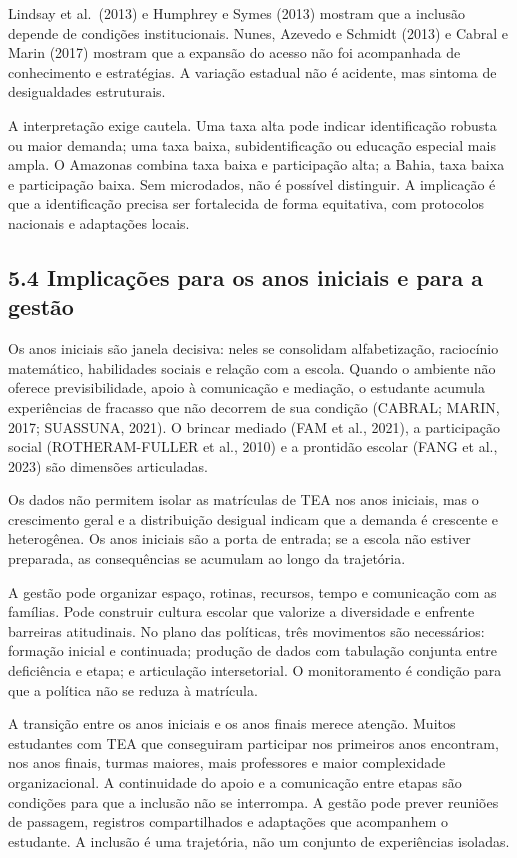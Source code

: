 Lindsay et al.~(2013) e Humphrey e Symes (2013) mostram que a inclusão
depende de condições institucionais. Nunes, Azevedo e Schmidt (2013) e
Cabral e Marin (2017) mostram que a expansão do acesso não foi
acompanhada de conhecimento e estratégias. A variação estadual não é
acidente, mas sintoma de desigualdades estruturais.

A interpretação exige cautela. Uma taxa alta pode indicar identificação
robusta ou maior demanda; uma taxa baixa, subidentificação ou educação
especial mais ampla. O Amazonas combina taxa baixa e participação alta;
a Bahia, taxa baixa e participação baixa. Sem microdados, não é possível
distinguir. A implicação é que a identificação precisa ser fortalecida
de forma equitativa, com protocolos nacionais e adaptações locais.

\subsection{5.4 Implicações para os anos iniciais e para a
gestão}\label{implicauxe7uxf5es-para-os-anos-iniciais-e-para-a-gestuxe3o}

Os anos iniciais são janela decisiva: neles se consolidam alfabetização,
raciocínio matemático, habilidades sociais e relação com a escola.
Quando o ambiente não oferece previsibilidade, apoio à comunicação e
mediação, o estudante acumula experiências de fracasso que não decorrem
de sua condição (CABRAL; MARIN, 2017; SUASSUNA, 2021). O brincar mediado
(FAM et al., 2021), a participação social (ROTHERAM-FULLER et al., 2010)
e a prontidão escolar (FANG et al., 2023) são dimensões articuladas.

Os dados não permitem isolar as matrículas de TEA nos anos iniciais, mas
o crescimento geral e a distribuição desigual indicam que a demanda é
crescente e heterogênea. Os anos iniciais são a porta de entrada; se a
escola não estiver preparada, as consequências se acumulam ao longo da
trajetória.

A gestão pode organizar espaço, rotinas, recursos, tempo e comunicação
com as famílias. Pode construir cultura escolar que valorize a
diversidade e enfrente barreiras atitudinais. No plano das políticas,
três movimentos são necessários: formação inicial e continuada; produção
de dados com tabulação conjunta entre deficiência e etapa; e articulação
intersetorial. O monitoramento é condição para que a política não se
reduza à matrícula.

A transição entre os anos iniciais e os anos finais merece atenção.
Muitos estudantes com TEA que conseguiram participar nos primeiros anos
encontram, nos anos finais, turmas maiores, mais professores e maior
complexidade organizacional. A continuidade do apoio e a comunicação
entre etapas são condições para que a inclusão não se interrompa. A
gestão pode prever reuniões de passagem, registros compartilhados e
adaptações que acompanhem o estudante. A inclusão é uma trajetória, não
um conjunto de experiências isoladas.

